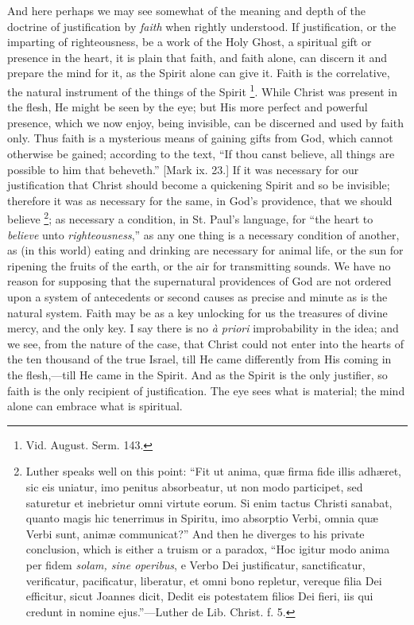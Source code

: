 And here perhaps we may see somewhat of the meaning and depth of
the doctrine of justification by \emph{faith} when rightly understood.
If justification, or the imparting of righteousness, be a work of the
Holy Ghost, a spiritual gift or presence in the heart, it is plain
that faith, and faith alone, can discern it and prepare the mind for
it, as the Spirit alone can give it. Faith is the correlative, the
natural instrument of the things of the Spirit \footnote{Vid. August.
Serm. 143.}. While Christ was present in the flesh, He might be seen by the
eye; but His more perfect and powerful presence, which we now enjoy,
being invisible, can be discerned and used by faith only. Thus
faith is a mysterious means of gaining gifts from God, which cannot
otherwise be gained; according to the text, ``If thou canst
believe, all things are possible to him that beheveth.'' [Mark ix.
23.] If it was necessary for our justification that Christ should
become a quickening Spirit and so be invisible; therefore it was as
necessary for the same, in God's providence, that we should believe \footnote{Luther speaks
well on this point: ``Fit ut anima, quæ firma fide illis adhæret,
sic eis uniatur, imo penitus absorbeatur, ut non modo participet, sed
saturetur et inebrietur omni virtute eorum. Si enim tactus Christi
sanabat, quanto magis hic tenerrimus in Spiritu, imo absorptio Verbi,
omnia quæ Verbi sunt, animæ communicat?'' And then he diverges
to his private conclusion, which is either a truism or a paradox,
``Hoc igitur modo anima per fidem \emph{solam, sine operibus}, e
Verbo Dei justificatur, sanctificatur, verificatur, pacificatur,
liberatur, et omni bono repletur, vereque filia Dei efficitur, sicut
Joannes dicit, Dedit eis potestatem filios Dei fieri, iis qui credunt
in nomine ejus.''—Luther de Lib. Christ. f. 5.}; as necessary a condition, in St. Paul's language, for
``the heart to \emph{believe} unto \emph{righteousness},'' as
any one thing is a necessary condition of another, as (in this world)
eating and drinking are necessary for animal life, or the sun for
ripening the fruits of the earth, or the air for transmitting sounds.
We have no reason for supposing that the supernatural providences of
God are not ordered upon a system of antecedents or second causes as
precise and minute as is the natural system. Faith may be as a key
unlocking for us the treasures of divine mercy, and the only key. I
say there is no \emph{à priori} improbability in the idea; and we
see, from the nature of the case, that Christ could not enter into the
hearts of the ten thousand of the true Israel, till He came differently from His coming in the flesh,—till He came in the
Spirit. And as the Spirit is the only justifier, so faith is the only
recipient of justification. The eye sees what is material; the mind
alone can embrace what is spiritual.

